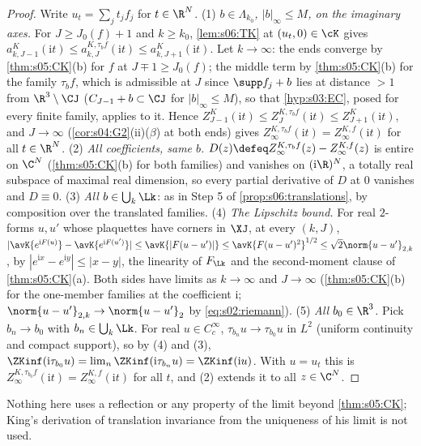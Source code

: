 \begin{proof}
Write $u_t=\sum_jt_jf_j$ for $t\in\R^N$.
(1) \emph{$b\in\Lambda_{k_0}$, $|b|_\infty\le M$, on the imaginary axes.} For $J\ge J_0(f)+1$ and $k\ge k_0$, \cref{lem:s06:TK} at $(u_t,0)\in\cK$ gives $a^K_{k,J-1}(\mathrm it)\le a^{K,\tau_bf}_{k,J}(\mathrm it)\le a^K_{k,J+1}(\mathrm it)$. Let $k\to\infty$: the ends converge by \cref{thm:s05:CK}(b) for $f$ at $J\mp1\ge J_0(f)$; the middle term by \cref{thm:s05:CK}(b) for the family $\tau_bf$, which is admissible at $J$ since $\supp f_j+b$ lies at distance $>1$ from $\R^3\setminus\CJ$ ($C_{J-1}+b\subset\CJ$ for $|b|_\infty\le M$), so that \cref{hyp:s03:EC}, posed for every finite family, applies to it. Hence $Z^K_{J-1}(\mathrm it)\le Z^{K,\tau_bf}_J(\mathrm it)\le Z^K_{J+1}(\mathrm it)$, and $J\to\infty$ (\cref{cor:s04:G2}(ii)($\beta$) at both ends) gives $Z^{K,\tau_bf}_\infty(\mathrm it)=Z^{K,f}_\infty(\mathrm it)$ for all $t\in\R^N$.
(2) \emph{All coefficients, same $b$.} $D(z)\defeq Z^{K,\tau_bf}_\infty(z)-Z^{K,f}_\infty(z)$ is entire on $\C^N$ (\cref{thm:s05:CK}(b) for both families) and vanishes on $(\mathrm i\R)^N$, a totally real subspace of maximal real dimension, so every partial derivative of $D$ at $0$ vanishes and $D\equiv0$.
(3) \emph{All $b\in\bigcup_k\Lk$}: as in Step 5 of \cref{prop:s06:translations}, by composition over the translated families.
(4) \emph{The Lipschitz bound.} For real $2$-forms $u,u'$ whose plaquettes have corners in $\XJ$, at every $(k,J)$, $|\avK{e^{\mathrm iF(u)}}-\avK{e^{\mathrm iF(u')}}|\le\avK{|F(u-u')|}\le{\avK{F(u-u')^2}}^{1/2}\le\sqrt2\norm{u-u'}_{2,k}$, by $|e^{\mathrm ix}-e^{\mathrm iy}|\le|x-y|$, the linearity of $F_{\Lk}$ and the second-moment clause of \cref{thm:s05:CK}(a). Both sides have limits as $k\to\infty$ and $J\to\infty$ (\cref{thm:s05:CK}(b) for the one-member families at the coefficient $\mathrm i$; $\norm{u-u'}_{2,k}\to\norm{u-u'}_2$ by \eqref{eq:s02:riemann}).
(5) \emph{All $b_0\in\R^3$.} Pick $b_n\to b_0$ with $b_n\in\bigcup_k\Lk$. For real $u\in C^\infty_c$, $\tau_{b_n}u\to\tau_{b_0}u$ in $L^2$ (uniform continuity and compact support), so by (4) and (3), $\ZKinf(\mathrm i\tau_{b_0}u)=\lim_n\ZKinf(\mathrm i\tau_{b_n}u)=\ZKinf(\mathrm iu)$. With $u=u_t$ this is $Z^{K,\tau_{b_0}f}_\infty(\mathrm it)=Z^{K,f}_\infty(\mathrm it)$ for all $t$, and (2) extends it to all $z\in\C^N$.
\end{proof}

Nothing here uses a reflection or any property of the limit beyond \cref{thm:s05:CK}; King's derivation of translation invariance from the uniqueness of his limit \cite[Thm.~2.3(i)]{K2} is not used.

